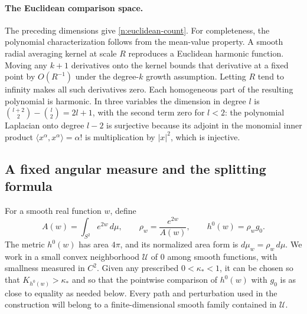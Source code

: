 \paragraph{The Euclidean comparison space.}
The preceding dimensions give \eqref{n:euclidean-count}.
For completeness, the polynomial characterization follows from the
mean-value property. A smooth radial averaging kernel at scale $R$
reproduces a Euclidean harmonic function. Moving any $k+1$ derivatives
onto the kernel bounds that derivative at a fixed point by $O(R^{-1})$
under the degree-$k$ growth assumption. Letting $R$ tend to infinity
makes all such derivatives zero. Each homogeneous part of the resulting
polynomial is harmonic. In three variables the dimension in degree $l$
is $\binom{l+2}{2}-\binom{l}{2}=2l+1$, with the second term zero for
$l<2$: the polynomial Laplacian onto degree $l-2$ is surjective because
its adjoint in the monomial inner product
$\langle x^\alpha,x^\alpha\rangle=\alpha!$ is multiplication by
$|x|^2$, which is injective.

\subsection{A fixed angular measure and the splitting formula}

For a smooth real function \(w\), define
\begin{equation}\label{n:eq-conformal-family}
 A(w)=\int_{S^2}e^{2w}\,d\mu,\qquad
 \rho_w=\frac{e^{2w}}{A(w)},\qquad
 h^0(w)=\rho_w g_0.
\end{equation}
The metric \(h^0(w)\) has area \(4\pi\), and its normalized area form is
\(d\mu_w=\rho_w\,d\mu\).  We work in a small convex neighborhood
\(\mathcal U\) of \(0\) among smooth functions, with smallness measured in
\(C^2\).  Given any prescribed \(0<\kappa_*<1\), it can be chosen
so that \(K_{h^0(w)}>\kappa_*\) and so that the
pointwise comparison of \(h^0(w)\) with \(g_0\) is as close to equality as
needed below.  Every path and perturbation used in the construction will
belong to a finite-dimensional smooth family contained in \(\mathcal U\).

